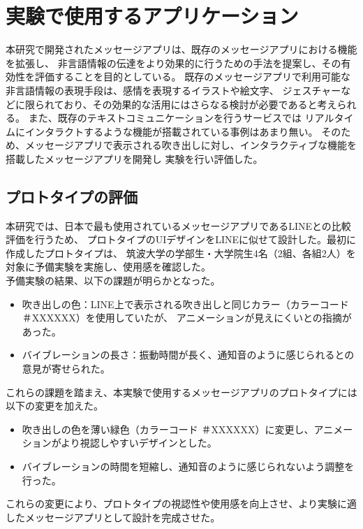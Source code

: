 \documentclass[11pt,a4paper]{ltjsreport}
\begin{document}
\section{実験で使用するアプリケーション}
本研究で開発されたメッセージアプリは、既存のメッセージアプリにおける機能を拡張し、
非言語情報の伝達をより効果的に行うための手法を提案し、その有効性を評価することを目的としている。
既存のメッセージアプリで利用可能な非言語情報の表現手段は、感情を表現するイラストや絵文字、
ジェスチャーなどに限られており、その効果的な活用にはさらなる検討が必要であると考えられる。
また、既存のテキストコミュニケーションを行うサービスでは
リアルタイムにインタラクトするような機能が搭載されている事例はあまり無い。
そのため、メッセージアプリで表示される吹き出しに対し、インタラクティブな機能を搭載したメッセージアプリを開発し
実験を行い評価した。

\subsection{プロトタイプの評価}
本研究では、日本で最も使用されているメッセージアプリであるLINEとの比較評価を行うため、
プロトタイプのUIデザインをLINEに似せて設計した。最初に作成したプロトタイプは、
筑波大学の学部生・大学院生4名（2組、各組2人）を対象に予備実験を実施し、使用感を確認した。\\

予備実験の結果、以下の課題が明らかとなった。
\begin{itemize}
    \item 吹き出しの色：LINE上で表示される吹き出しと同じカラー（カラーコード ＃XXXXXX）を使用していたが、
          アニメーションが見えにくいとの指摘があった。
    \item バイブレーションの長さ：振動時間が長く、通知音のように感じられるとの意見が寄せられた。
\end{itemize}

これらの課題を踏まえ、本実験で使用するメッセージアプリのプロトタイプには以下の変更を加えた。

\begin{itemize}
    \item 吹き出しの色を薄い緑色（カラーコード ＃XXXXXX）に変更し、アニメーションがより視認しやすいデザインとした。
    \item バイブレーションの時間を短縮し、通知音のように感じられないよう調整を行った。
\end{itemize}

これらの変更により、プロトタイプの視認性や使用感を向上させ、より実験に適したメッセージアプリとして設計を完成させた。
\end{document}
